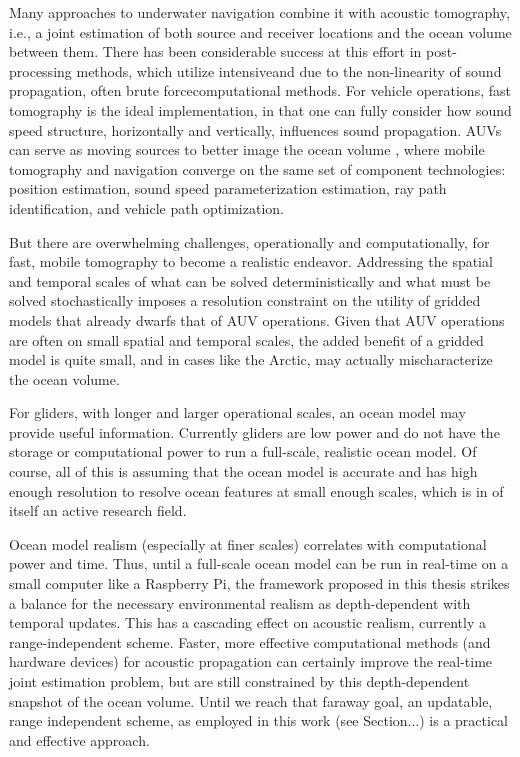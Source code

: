 Many approaches to underwater navigation combine it with acoustic tomography, i.e., a joint estimation of both source and receiver locations and the ocean volume between them.
There has been considerable success at this effort in post-processing methods, which utilize intensive\textemdash and due to the non-linearity of sound propagation, often brute force\textemdash computational methods. 
For vehicle operations, fast tomography is the ideal implementation, in that one can fully consider how sound speed structure, horizontally and vertically, influences sound propagation.
AUVs can serve as moving sources to better image the ocean volume \citep{deffenbaugh_optimal_1997,elisseeff_ocean_2002}, where mobile tomography and navigation converge on the same set of component technologies: position estimation, sound speed parameterization estimation, ray path identification, and vehicle path optimization.

But there are overwhelming challenges, operationally and computationally, for fast, mobile tomography to become a realistic endeavor.
Addressing the spatial and temporal scales of what can be solved deterministically and what must be solved stochastically imposes a resolution constraint on the utility of gridded models that already dwarfs that of AUV operations.
Given that AUV operations are often on small spatial and temporal scales, the added benefit of a gridded model is quite small, and in cases like the Arctic, may actually mischaracterize the ocean volume. 

For gliders, with longer and larger operational scales, an ocean model may provide useful information.
Currently gliders are low power and do not have the storage or computational power to run a full-scale, realistic ocean model.
Of course, all of this is assuming that the ocean model is accurate and has high enough resolution to resolve ocean features at small enough scales, which is in of itself an active research field.

Ocean model realism (especially at finer scales) correlates with computational power and time.
Thus, until a full-scale ocean model can be run in real-time on a small computer like a Raspberry Pi, the framework proposed in this thesis strikes a balance for the necessary environmental realism as depth-dependent with temporal updates.
This has a cascading effect on acoustic realism, currently a range-independent scheme.
Faster, more effective computational methods (and hardware devices) for acoustic propagation can certainly improve the real-time joint estimation problem, but are still constrained by this depth-dependent snapshot of the ocean volume.
Until we reach that faraway goal, an updatable, range independent scheme, as employed in this work (see Section...) is a practical and effective approach.

